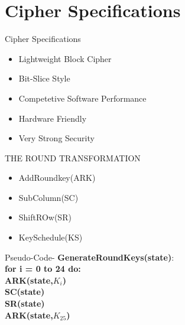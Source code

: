 \section{Cipher Specifications}

\begin{frame}{Cipher Specifications}
\begin{block}{}
    \begin{itemize}
        \item Lightweight Block Cipher
        \item Bit-Slice Style
        \item Competetive Software Performance
        \item Hardware Friendly
        \item Very Strong Security
    \end{itemize}
\end{block}
\end{frame}

\begin{frame}{THE ROUND TRANSFORMATION}
\begin{block}{}
    \begin{itemize}
        \item AddRoundkey(ARK)
        \item SubColumn(SC)
        \item ShiftROw(SR)
        \item KeySchedule(KS)
    \end{itemize}
\end{block}
\end{frame}


\begin{frame}
\begin{block}{Pseudo-Code-}
    \textbf{GenerateRoundKeys(state)}:\\
\hspace*{1cm}\textbf{for i = 0 to 24 do:}\\
\hspace*{2cm}\textbf{ARK(state,$K_i$)}\\
\hspace*{2cm}\textbf{SC(state)}\\
\hspace*{2cm}\textbf{SR(state)}\\
\hspace*{1cm}\textbf{ARK(state,$K_{25}$)}\\
    \end{block}
\end{frame}



